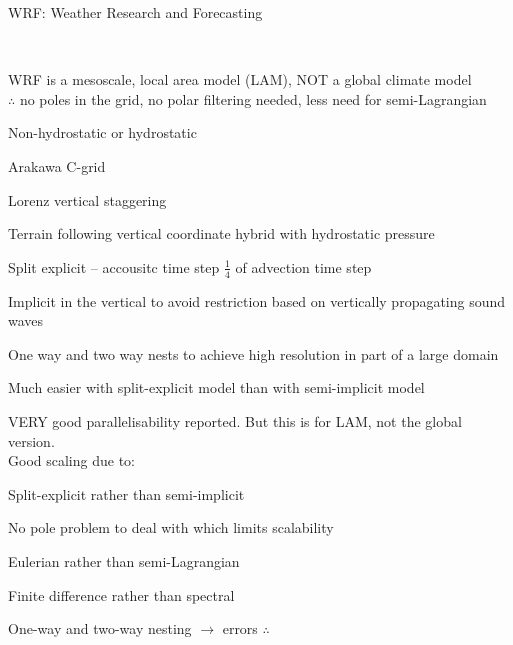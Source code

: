 \begin{slide}{WRF: Weather Research and Forecasting}

\ \\
\begin{list0}

\item WRF is a mesoscale, local area model (LAM), NOT a global climate model\\
$\therefore$ no poles in the grid, no polar filtering needed, less need for semi-Lagrangian

\item Non-hydrostatic or hydrostatic

\item Arakawa C-grid

\item Lorenz vertical staggering

\item Terrain following vertical coordinate hybrid with hydrostatic pressure

\item Split explicit -- accousitc time step $\frac{1}{4}$ of advection time step

\item Implicit in the vertical to avoid restriction based on vertically propagating sound waves


\item One way and two way nests to achieve high resolution in part of a large domain
\begin{list1}
    \item Much easier with split-explicit model than with semi-implicit model
\end{list1}

\item VERY good parallelisability reported. But this is for LAM, not the global version.\\Good scaling due to:
\begin{list1}
    \item Split-explicit rather than semi-implicit
    \item No pole problem to deal with which limits scalability
    \item Eulerian rather than semi-Lagrangian
    \item Finite difference rather than spectral
\end{list1}

\item One-way and two-way nesting $\rightarrow$ errors $\therefore$

\end{list0}

\end{slide}

